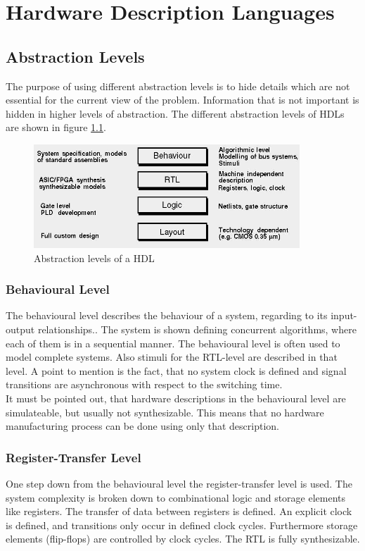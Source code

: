\chapter{Hardware Description Languages}

\section{Abstraction Levels}
The purpose of using different abstraction levels is to hide details which are not essential for the current view of the problem. Information that is not important is hidden in higher levels of abstraction. The different abstraction levels of HDLs are shown in figure \ref{fig:hdlabstractionlevels}.
\begin{figure}[htbp]
\begin{center}
\includegraphics[width=10cm,keepaspectratio=true]{bilder/png/hdlabstractionlevels}
\caption{Abstraction levels of a HDL \cite{Ver16}}
\label{fig:hdlabstractionlevels}
\end{center}
\end{figure}
\subsection{Behavioural Level}
The behavioural level describes the behaviour of a system, regarding to its input-output relationships.\cite{Hartenstein1987}. The system is shown defining concurrent algorithms, where each of them is in a sequential manner. The behavioural level is often used to model complete systems. Also stimuli for the RTL-level are described in that level. A point to mention is the fact, that no system clock is defined and signal transitions are asynchronous with respect to the switching time.\\
It must be pointed out, that hardware descriptions in the behavioural level are simulateable, but usually not synthesizable. This means that no hardware manufacturing process can be done using only that description.\cite{Ver16}
\subsection{Register-Transfer Level}
One step down from the behavioural level the register-transfer level is used. The system complexity is broken down to combinational logic and storage elements like registers. The transfer of data between registers is defined. An explicit clock is defined, and transitions only occur in defined clock cycles. Furthermore storage elements (flip-flops) are controlled by clock cycles. The RTL is fully synthesizable.\cite{Ver16}\cite{Asic14}
